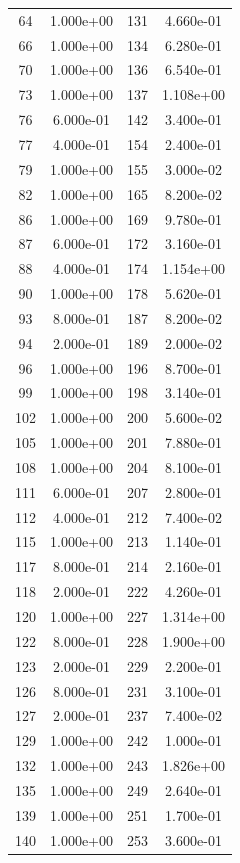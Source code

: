 \documentclass[12pt]{article}
\begin{document}
\begin{longtable}{@{}cccc@{}}
64 & 1.000e+00 & 131 & 4.660e-01 \\
66 & 1.000e+00 & 134 & 6.280e-01 \\
70 & 1.000e+00 & 136 & 6.540e-01 \\
73 & 1.000e+00 & 137 & 1.108e+00 \\
76 & 6.000e-01 & 142 & 3.400e-01 \\
77 & 4.000e-01 & 154 & 2.400e-01 \\
79 & 1.000e+00 & 155 & 3.000e-02 \\
82 & 1.000e+00 & 165 & 8.200e-02 \\
86 & 1.000e+00 & 169 & 9.780e-01 \\
87 & 6.000e-01 & 172 & 3.160e-01 \\
88 & 4.000e-01 & 174 & 1.154e+00 \\
90 & 1.000e+00 & 178 & 5.620e-01 \\
93 & 8.000e-01 & 187 & 8.200e-02 \\
94 & 2.000e-01 & 189 & 2.000e-02 \\
96 & 1.000e+00 & 196 & 8.700e-01 \\
99 & 1.000e+00 & 198 & 3.140e-01 \\
102 & 1.000e+00 & 200 & 5.600e-02 \\
105 & 1.000e+00 & 201 & 7.880e-01 \\
108 & 1.000e+00 & 204 & 8.100e-01 \\
111 & 6.000e-01 & 207 & 2.800e-01 \\
112 & 4.000e-01 & 212 & 7.400e-02 \\
115 & 1.000e+00 & 213 & 1.140e-01 \\
117 & 8.000e-01 & 214 & 2.160e-01 \\
118 & 2.000e-01 & 222 & 4.260e-01 \\
120 & 1.000e+00 & 227 & 1.314e+00 \\
122 & 8.000e-01 & 228 & 1.900e+00 \\
123 & 2.000e-01 & 229 & 2.200e-01 \\
126 & 8.000e-01 & 231 & 3.100e-01 \\
127 & 2.000e-01 & 237 & 7.400e-02 \\
129 & 1.000e+00 & 242 & 1.000e-01 \\
132 & 1.000e+00 & 243 & 1.826e+00 \\
135 & 1.000e+00 & 249 & 2.640e-01 \\
139 & 1.000e+00 & 251 & 1.700e-01 \\
140 & 1.000e+00 & 253 & 3.600e-01 \\

\end{longtable}
\end{document}
